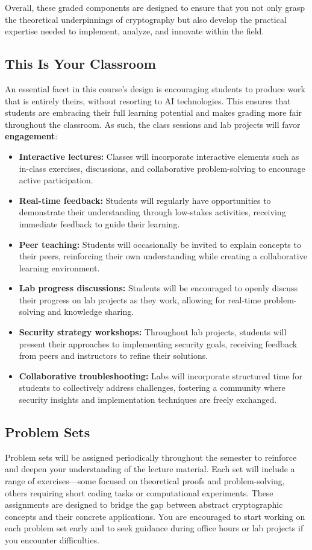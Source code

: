 \documentclass[10pt,a4paper,american]{article}
\begin{document}
Overall, these graded components are designed to ensure that you not only grasp the theoretical underpinnings of cryptography but also develop the practical expertise needed to implement, analyze, and innovate within the field.

\subsection{This Is Your Classroom}
An essential facet in this course's design is encouraging students to produce work that is entirely theirs, without resorting to AI technologies. This ensures that students are embracing their full learning potential and makes grading more fair throughout the classroom. As such, the class sessions and lab projects will favor \textbf{engagement}:

\begin{itemize}
	\item \textbf{Interactive lectures:} Classes will incorporate interactive elements such as in-class exercises, discussions, and collaborative problem-solving to encourage active participation.
	\item \textbf{Real-time feedback:} Students will regularly have opportunities to demonstrate their understanding through low-stakes activities, receiving immediate feedback to guide their learning.
	\item \textbf{Peer teaching:} Students will occasionally be invited to explain concepts to their peers, reinforcing their own understanding while creating a collaborative learning environment.
	\item \textbf{Lab progress discussions:} Students will be encouraged to openly discuss their progress on lab projects as they work, allowing for real-time problem-solving and knowledge sharing.
	\item \textbf{Security strategy workshops:} Throughout lab projects, students will present their approaches to implementing security goals, receiving feedback from peers and instructors to refine their solutions.
	\item \textbf{Collaborative troubleshooting:} Labs will incorporate structured time for students to collectively address challenges, fostering a community where security insights and implementation techniques are freely exchanged.
\end{itemize}

\subsection{Problem Sets}
Problem sets will be assigned periodically throughout the semester to reinforce and deepen your understanding of the lecture material. Each set will include a range of exercises—some focused on theoretical proofs and problem-solving, others requiring short coding tasks or computational experiments. These assignments are designed to bridge the gap between abstract cryptographic concepts and their concrete applications. You are encouraged to start working on each problem set early and to seek guidance during office hours or lab projects if you encounter difficulties.
\end{document}
